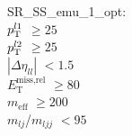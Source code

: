 SR\_SS\_emu\_1\_opt: \\
$p_{\text{T}}^{l1}$ $\geq 25$ \\
$p_{\text{T}}^{l2}$ $\geq 25$ \\
$|\Delta\eta_{ll}|$ $<1.5$ \\
$E_{\text{T}}^{\text{miss,rel}}$ $\geq 80$ \\
$m_{\text{eff}}$ $\geq 200$ \\
$m_{lj}$/$m_{ljj}$ $<95$ \\
